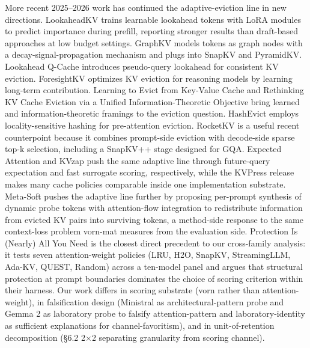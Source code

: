 \documentclass[10pt]{article}
\begin{document}
More recent 2025--2026 work has continued the adaptive-eviction line in
new directions. LookaheadKV \citep{lookahead2026kv}
trains learnable lookahead tokens with LoRA modules to predict
importance during prefill, reporting stronger results than draft-based
approaches at low budget settings. GraphKV
\citep{graphkv2025} models tokens as graph nodes with a
decay-signal-propagation mechanism and plugs into SnapKV and PyramidKV.
Lookahead Q-Cache \citep{lookaheadqcache2025} introduces
pseudo-query lookahead for consistent KV eviction. ForesightKV
\citep{foresightkv2026} optimizes KV eviction for
reasoning models by learning long-term contribution. Learning to Evict
from Key-Value Cache \citep{learntoevict2026} and
Rethinking KV Cache Eviction via a Unified Information-Theoretic
Objective \citep{unifiedinfo2026} bring learned and
information-theoretic framings to the eviction question. HashEvict
\citep{hashevict2024} employs locality-sensitive hashing
for pre-attention eviction. RocketKV
\citep{behnam2025rocketkv} is a useful recent
counterpoint because it combines prompt-side eviction with decode-side
sparse top-k selection, including a SnapKV++ stage designed for GQA.
Expected Attention \citep{devoto2025expectedattention}
and KVzap \citep{jegou2026kvzap} push the same adaptive
line through future-query expectation and fast surrogate scoring,
respectively, while the KVPress release makes many cache policies
comparable inside one implementation substrate. Meta-Soft
\citep{luo2026metasoft} pushes the adaptive line further by proposing
per-prompt synthesis of dynamic probe tokens with attention-flow
integration to redistribute information from evicted KV pairs into
surviving tokens, a method-side response to the same context-loss
problem vorn-mat measures from the evaluation side. Protection Is (Nearly)
All You Need \citep{garcia2026protection} is the closest
direct precedent to our cross-family analysis: it tests seven
attention-weight policies (LRU, H2O, SnapKV, StreamingLLM, Ada-KV,
QUEST, Random) across a ten-model panel and argues that structural
protection at prompt boundaries dominates the choice of scoring
criterion within their harness. Our work differs in scoring substrate
(vorn rather than attention-weight), in falsification
design (Ministral as architectural-pattern probe and Gemma 2 as
laboratory probe to falsify attention-pattern and laboratory-identity
as sufficient explanations for channel-favoritism), and in
unit-of-retention decomposition (\S{}6.2 2$\times$2 separating granularity from
scoring channel).
\end{document}
